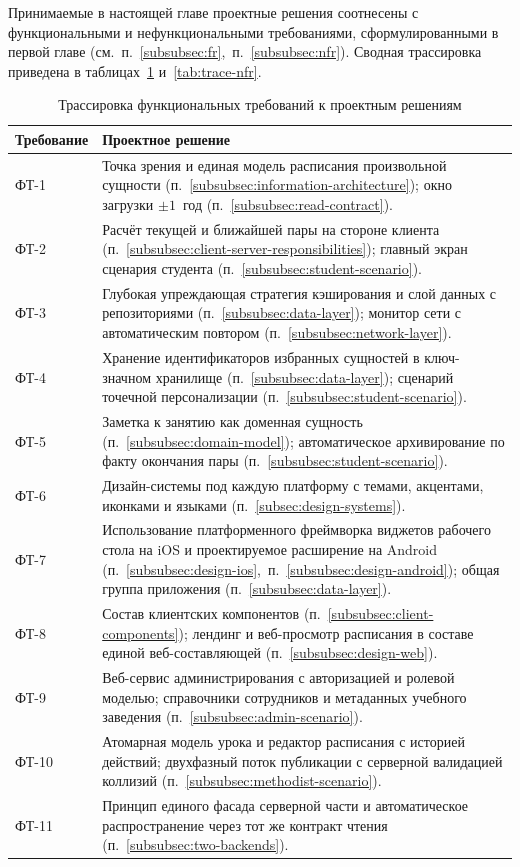 Принимаемые в настоящей главе проектные решения соотнесены с функциональными и нефункциональными требованиями, сформулированными в первой главе (см.~п.~\ref{subsubsec:fr},~п.~\ref{subsubsec:nfr}). Сводная трассировка приведена в таблицах~\ref{tab:trace-fr} и~\ref{tab:trace-nfr}.

\begin{table}[h]
  \caption{Трассировка функциональных требований к проектным решениям}
  \label{tab:trace-fr}
  \centering
  \small
  \begin{tabular}{p{} p{}}
    \toprule
    Требование & Проектное решение \\
    \midrule
    ФТ-1   & Точка зрения и единая модель расписания произвольной сущности (п.~\ref{subsubsec:information-architecture}); окно загрузки $\pm 1$~год (п.~\ref{subsubsec:read-contract}). \\
    ФТ-2   & Расчёт текущей и ближайшей пары на стороне клиента (п.~\ref{subsubsec:client-server-responsibilities}); главный экран сценария студента (п.~\ref{subsubsec:student-scenario}). \\
    ФТ-3   & Глубокая упреждающая стратегия кэширования и слой данных с репозиториями (п.~\ref{subsubsec:data-layer}); монитор сети с автоматическим повтором (п.~\ref{subsubsec:network-layer}). \\
    ФТ-4   & Хранение идентификаторов избранных сущностей в ключ-значном хранилище (п.~\ref{subsubsec:data-layer}); сценарий точечной персонализации (п.~\ref{subsubsec:student-scenario}). \\
    ФТ-5   & Заметка к занятию как доменная сущность (п.~\ref{subsubsec:domain-model}); автоматическое архивирование по факту окончания пары (п.~\ref{subsubsec:student-scenario}). \\
    ФТ-6   & Дизайн-системы под каждую платформу с темами, акцентами, иконками и языками (п.~\ref{subsec:design-systems}). \\
    ФТ-7   & Использование платформенного фреймворка виджетов рабочего стола на iOS и проектируемое расширение на Android (п.~\ref{subsubsec:design-ios},~п.~\ref{subsubsec:design-android}); общая группа приложения (п.~\ref{subsubsec:data-layer}). \\
    ФТ-8   & Состав клиентских компонентов (п.~\ref{subsubsec:client-components}); лендинг и веб-просмотр расписания в составе единой веб-составляющей (п.~\ref{subsubsec:design-web}). \\
    ФТ-9   & Веб-сервис администрирования с авторизацией и ролевой моделью; справочники сотрудников и метаданных учебного заведения (п.~\ref{subsubsec:admin-scenario}). \\
    ФТ-10  & Атомарная модель урока и редактор расписания с историей действий; двухфазный поток публикации с серверной валидацией коллизий (п.~\ref{subsubsec:methodist-scenario}). \\
    ФТ-11  & Принцип единого фасада серверной части и автоматическое распространение через тот же контракт чтения (п.~\ref{subsubsec:two-backends}). \\
    \bottomrule
  \end{tabular}
\end{table}


